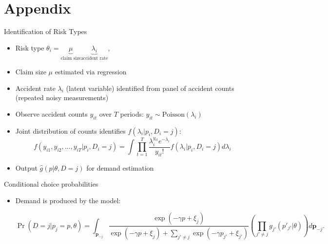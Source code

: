 \documentclass[10pt,aspectratio=169]{beamer}
\begin{document}
\section{Appendix}
\begin{frame}{Identification of Risk Types}\label{appendix:slide1}
\begin{itemize}
  \item Risk type $\theta_i = \underbrace{\mu}_{\text{claim size}} \underbrace{\lambda_i}_{\text{accident rate}}$, 
  \item Claim size $\mu$ estimated via regression 
  \item Accident rate $\lambda_i$ (latent variable) identified from panel of accident counts (repeated noisy measurements)
   
  \item Observe accident counts $y_{it}$ over $T$ periods: $y_{it} \sim \text{Poisson}(\lambda_i)$
  \item Joint distribution of counts identifies $f(\lambda_i | p_i, D_i=j)$:
    \[
    f(y_{i1}, y_{i2}, \ldots, y_{iT} | p_i, D_i=j) = \int \prod_{t=1}^{T} \frac{\lambda_i^{y_{it}} e^{-\lambda_i}}{y_{it}!} f(\lambda_i | p_i, D_i=j) d\lambda_i
    \]
    \item Output  $\hat{g}(p | \theta, D=j)$ for demand estimation 
    \hyperlink{estimation:overview}{}
\end{itemize}
\end{frame}

\begin{frame}{Conditional choice probabilities}\label{appendix:slide2}
\begin{itemize}
  \item Demand is produced by the model: 
  
  \[
  \Pr(D=j|p_j=p, \theta) = \int_{\mathbf{p}_{-j}} \frac{\exp(-\gamma p + \xi_j)}{\exp(-\gamma p + \xi_j) + \sum_{j' \ne j} \exp(-\gamma p_{j'} + \xi_{j'})} \left( \prod_{j' \ne j} g_{j'}(p'_{j'}|\theta) \right) d\textbf{p}_{-j}.
  \]
    \hyperlink{estimation:demand}{}
\end{itemize}
\end{frame}
\end{document}
